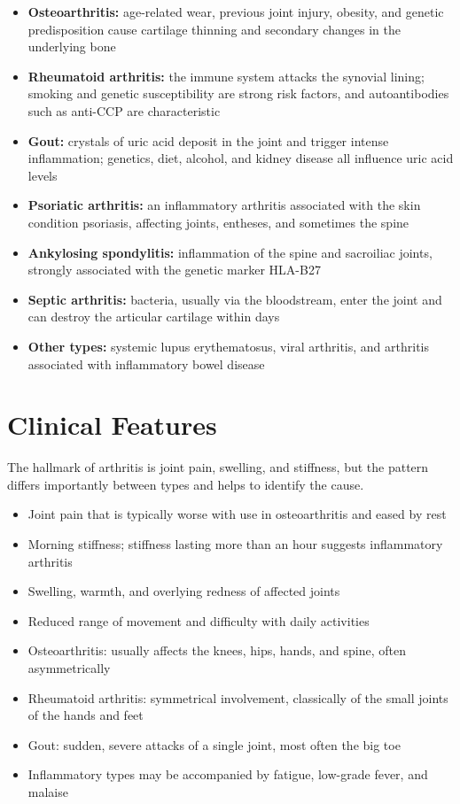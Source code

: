 \begin{itemize}
    \item \textbf{Osteoarthritis:} age-related wear, previous joint injury, obesity, and genetic predisposition cause cartilage thinning and secondary changes in the underlying bone
    \item \textbf{Rheumatoid arthritis:} the immune system attacks the synovial lining; smoking and genetic susceptibility are strong risk factors, and autoantibodies such as anti-CCP are characteristic
    \item \textbf{Gout:} crystals of uric acid deposit in the joint and trigger intense inflammation; genetics, diet, alcohol, and kidney disease all influence uric acid levels
    \item \textbf{Psoriatic arthritis:} an inflammatory arthritis associated with the skin condition psoriasis, affecting joints, entheses, and sometimes the spine
    \item \textbf{Ankylosing spondylitis:} inflammation of the spine and sacroiliac joints, strongly associated with the genetic marker HLA-B27
    \item \textbf{Septic arthritis:} bacteria, usually via the bloodstream, enter the joint and can destroy the articular cartilage within days
    \item \textbf{Other types:} systemic lupus erythematosus, viral arthritis, and arthritis associated with inflammatory bowel disease
\end{itemize}

\section*{Clinical Features}
The hallmark of arthritis is joint pain, swelling, and stiffness, but the pattern differs importantly between types and helps to identify the cause.

\begin{itemize}
    \item Joint pain that is typically worse with use in osteoarthritis and eased by rest
    \item Morning stiffness; stiffness lasting more than an hour suggests inflammatory arthritis
    \item Swelling, warmth, and overlying redness of affected joints
    \item Reduced range of movement and difficulty with daily activities
    \item Osteoarthritis: usually affects the knees, hips, hands, and spine, often asymmetrically
    \item Rheumatoid arthritis: symmetrical involvement, classically of the small joints of the hands and feet
    \item Gout: sudden, severe attacks of a single joint, most often the big toe
    \item Inflammatory types may be accompanied by fatigue, low-grade fever, and malaise
\end{itemize}

